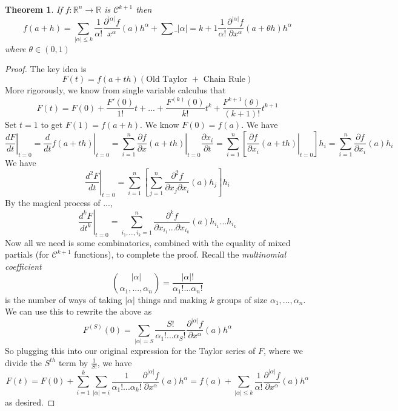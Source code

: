 \documentclass{article}
\newtheorem{theorem}{Theorem}
\newcommand{\reals}[0]{\mathbb{R}}
\newcommand{\mc}[1]{\mathcal{#1}}
\newcommand{\prt}[2]{\frac{\partial #1}{\partial #2}}
\begin{document}
\begin{theorem}
  If \(f: \reals^n \to \reals\) is \(\mc{C}^{k + 1}\) then
  \[f(a + h) = \sum_{|\alpha| \leq k}\frac{1}{\alpha!}\frac{\partial^{|\alpha|}f}{x^\alpha}(a)h^\alpha + \sum\_{|\alpha| = k + 1}\frac{1}{\alpha!}\frac{\partial^{|\alpha|}f}{\partial x^\alpha}(a + \theta h)h^\alpha\]
  where \(\theta \in (0, 1)\)
\end{theorem}
\begin{proof}
  The key idea is
  \[F(t) = f(a + th)(\text{Old Taylor } + \text{ Chain Rule})\]
  More rigorously, we know from single variable calculus that
  \[F(t) = F(0) + \frac{F'(0)}{1!}t + ... + \frac{F^{(k)}(0)}{k!}t^k + \frac{F^{k + 1}(\theta)}{(k + 1)!}t^{k + 1}\]
  Set \(t = 1\) to get \(F(1) = f(a + h)\).
  We know \(F(0) = f(a)\). We have
  \[\left.\frac{dF}{dt}\right|_{t = 0} = \left.\frac{d}{dt}f(a + th)\right|_{t = 0} = \sum_{i = 1}^n\left.\prt{f}{x}(a + th)\right|_{t = 0}\prt{x_i}{t} = \sum_{i = 1}^n\left[\left.\prt{f}{x_i}(a + th)\right|_{t = 0}\right]h_i
  = \sum_{i = 1}^n\prt{f}{x_i}(a)h_i\]
  We have
  \[\left.\frac{d^2F}{dt}\right|_{t = 0} = \sum_{i = 1}^n\left[
    \sum_{j = 1}^n\frac{\partial^2f}{\partial x_j \partial x_i}(a)h_j
  \right]h_i\]
  By the magical process of ...,
  \[\left.\frac{d^kF}{dt^k}\right|_{t = 0} = \sum_{i_1,...,i_k = 1}^n\frac{\partial^kf}{\partial x_{i_1} ... \partial x_{i_k}}(a)h_{i_1}...h_{i_k}\]
  Now all we need is some combinatorics, combined with the equality of mixed partials (for \(\mc{C}^{k + 1}\) functions), to complete the proof. Recall the \textit{multinomial coefficient}
  \[{{|\alpha|} \choose {\alpha_1,...,\alpha_n}} = \frac{|\alpha|!}{\alpha_1!...\alpha_n!}\]
  is the number of ways of taking \(|\alpha|\) things and making \(k\) groups of size \(\alpha_1,...,\alpha_n\).
  We can use this to rewrite the above as
  \[F^{(S)}(0) = \sum_{|\alpha| = S}\frac{S!}{\alpha_1!...\alpha_S!}\frac{\partial^{|\alpha|}f}{\partial x^\alpha}(a)h^\alpha\]
  So plugging this into our original expression for the Taylor series of \(F\), where we divide the \(S^{th}\) term by \(\frac{1}{S!}\), we have
  \[F(t) = F(0) + \sum_{i = 1}^k\sum_{|\alpha| = i}\frac{1}{\alpha_1!...\alpha_k!}\frac{\partial^{|\alpha|}f}{\partial x^\alpha}(a)h^\alpha
  = f(a) + \sum_{|\alpha| \leq k}\frac{1}{\alpha!}\frac{\partial^{|\alpha|}f}{\partial x^\alpha}(a)h^\alpha\]
  as desired.

\end{proof}
\end{document}
